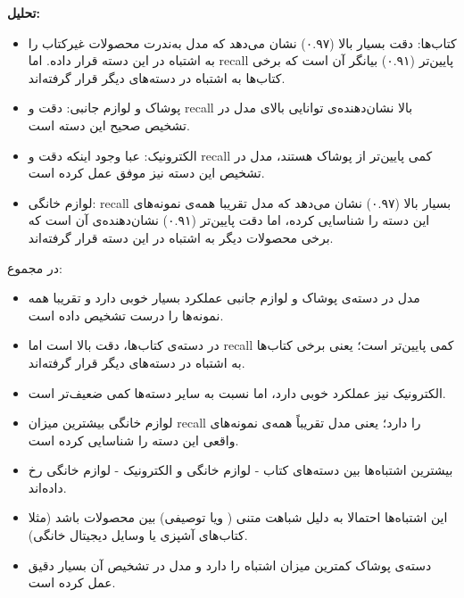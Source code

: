 \documentclass[a4paper,12pt]{article}
\begin{document}
\textbf{تحلیل:}
\begin{itemize}

  \item کتاب‌ها: دقت بسیار بالا (۰.۹۷) نشان می‌دهد که مدل به‌ندرت محصولات غیرکتاب را به اشتباه در این دسته قرار داده. اما recall پایین‌تر (۰.۹۱) بیانگر آن است که برخی کتاب‌ها به اشتباه در دسته‌های دیگر قرار گرفته‌اند.

  \item پوشاک و لوازم جانبی: دقت و recall بالا نشان‌دهنده‌ی توانایی بالای مدل در تشخیص صحیح این دسته است.

  \item الکترونیک: عبا وجود اینکه دقت و recall  کمی پایین‌تر از پوشاک هستند، مدل در تشخیص این دسته نیز موفق عمل کرده است.

  \item لوازم خانگی: recall  بسیار بالا (۰.۹۷) نشان می‌دهد که مدل تقریبا همه‌ی نمونه‌های  این دسته را شناسایی کرده، اما دقت پایین‌تر (۰.۹۱) نشان‌دهنده‌ی آن است که برخی محصولات دیگر به اشتباه در این دسته قرار گرفته‌اند.
\end{itemize}
در مجموع:
\begin{itemize}
  \item مدل در دسته‌ی پوشاک و لوازم جانبی عملکرد بسیار خوبی دارد و تقریبا همه نمونه‌ها را درست تشخیص داده است.

  \item در دسته‌ی کتاب‌ها، دقت بالا است اما recall کمی پایین‌تر است؛ یعنی برخی کتاب‌ها به اشتباه در دسته‌های دیگر قرار گرفته‌اند.

  \item الکترونیک نیز عملکرد خوبی دارد، اما نسبت به سایر دسته‌ها کمی ضعیف‌تر است.

  \item لوازم خانگی بیشترین میزان recall را دارد؛ یعنی مدل تقریباً همه‌ی نمونه‌های واقعی این دسته را شناسایی کرده است.
  \item بیشترین اشتباه‌ها بین دسته‌های کتاب - لوازم خانگی و الکترونیک - لوازم خانگی رخ داده‌اند.

  \item این اشتباه‌ها احتمالا به دلیل شباهت متنی ( ویا توصیفی) بین محصولات باشد (مثلا کتاب‌های آشپزی یا وسایل دیجیتال خانگی).

  \item دسته‌ی پوشاک کمترین میزان اشتباه را دارد و مدل در تشخیص آن بسیار دقیق عمل کرده است.
\end{itemize}

\vspace{0.4cm}
\end{document}
